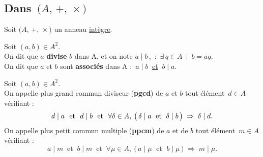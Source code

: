 \vspace{1.5cm}

\subsection{Dans $\,\bigl(A,\,+,\,\times\bigr)$}

\vspace{0.3cm}

\begin{center}
    Soit $\bigl(A,\,+,\,\times\bigr)$ un anneau \underline{intègre}.
\end{center}

\vspace{1cm}

Soit \((a,b)\in A^2\).\vspace{0.1cm}\\
On dit que $a$ \textbf{divise} $b$ dans A, et on note $a\mid b\,$,\, \ssi : \(\,\exists\, q\in A\ \mid \ b=aq.\)\vspace{0.1cm}\\
On dit que $a$ et $b$ sont \textbf{associés} dans A \ssi :\, $a\mid b\:$ \underline{et} $\:b\mid a$.

\vspace{1.5cm}

Soit \((a,b)\in A^2\).\vspace{0.1cm}\\
On appelle plus grand commun diviseur (\textbf{pgcd}) de $a$ et $b$ tout élément $\,d\in\! A\,$ vérifiant :\vspace{-0.3cm}
\[d\mid a\ \text{ et }\ d\mid b\ \text{ et }\ \forall \delta\in A,\: \bigl(\,\delta \mid a \; \text{ et } \; \delta\mid b\, \bigr)\; \Rightarrow \; \delta \mid d.\vspace{0.1cm}\]
On appelle plus petit commun multiple (\textbf{ppcm}) de $a$ et de $b$ tout élément $\,m\in\! A\,$ vérifiant :\vspace{-0.3cm}
\[a\mid m\ \text{ et }\ b\mid m \ \text{ et }\ \forall \mu\in A,\: \bigl(\, a\mid \mu \; \text{ et }\; b\mid \mu\, \bigr)\; \Rightarrow \; m\mid \mu. \]

\newpage

